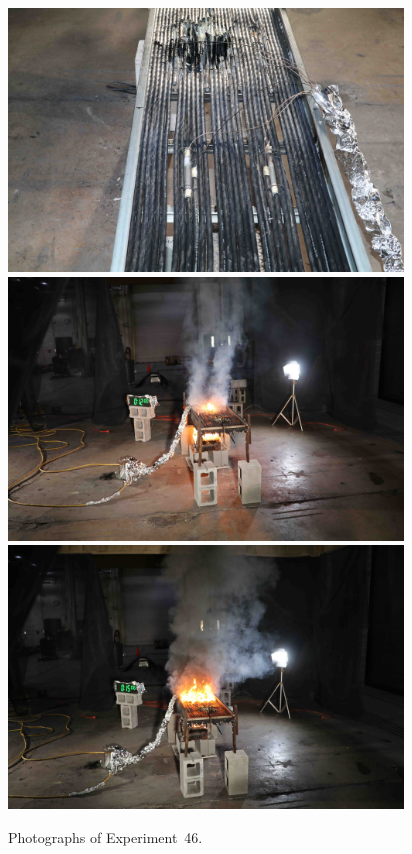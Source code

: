 \documentclass[12pt]{article}
\begin{document}
\begin{figure}[p]
\centering
\includegraphics[height=2.75in]{../FIGURES/Test_46_setup} \\
\includegraphics[height=2.75in]{../FIGURES/Test_46_ignition} \\
\includegraphics[height=2.75in]{../FIGURES/Test_46_burning}
\caption[Photographs of Experiment~46]{Photographs of Experiment~46.}
\label{fig:Test_46_photos}
\end{figure}


\clearpage
\end{document}
